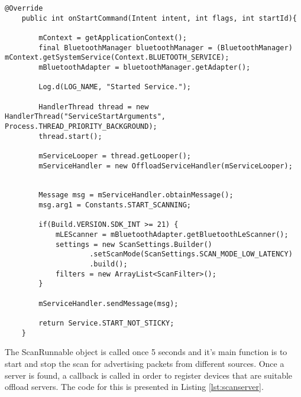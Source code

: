 \lstset{language=java,caption=onStartCommand() of OffloadService,label=lst:onstartcommand}
\begin{lstlisting}
@Override
    public int onStartCommand(Intent intent, int flags, int startId){

        mContext = getApplicationContext();
        final BluetoothManager bluetoothManager = (BluetoothManager) mContext.getSystemService(Context.BLUETOOTH_SERVICE);
        mBluetoothAdapter = bluetoothManager.getAdapter();

        Log.d(LOG_NAME, "Started Service.");

        HandlerThread thread = new HandlerThread("ServiceStartArguments", Process.THREAD_PRIORITY_BACKGROUND);
        thread.start();

        mServiceLooper = thread.getLooper();
        mServiceHandler = new OffloadServiceHandler(mServiceLooper);


        Message msg = mServiceHandler.obtainMessage();
        msg.arg1 = Constants.START_SCANNING;

        if(Build.VERSION.SDK_INT >= 21) {
            mLEScanner = mBluetoothAdapter.getBluetoothLeScanner();
            settings = new ScanSettings.Builder()
                    .setScanMode(ScanSettings.SCAN_MODE_LOW_LATENCY)
                    .build();
            filters = new ArrayList<ScanFilter>();
        }

        mServiceHandler.sendMessage(msg);

        return Service.START_NOT_STICKY;
    }
\end{lstlisting}

The ScanRunnable object is called once 5 seconds and it's main function is to start and stop the scan for advertising packets from different sources. Once a server is found, a callback is called in order to register devices that are suitable offload servers. The code for this is presented in Listing \ref{lst:scanserver}.

